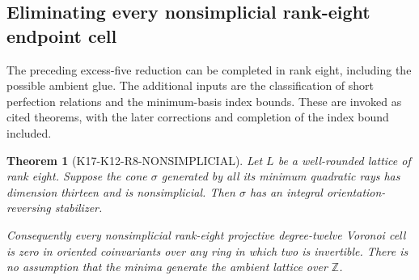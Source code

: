 \documentclass[11pt,a4paper]{article}
\newtheorem{theorem}{Theorem}[section]
\theoremstyle{definition}
\begin{document}
\subsection{Eliminating every nonsimplicial rank-eight endpoint cell}
\label{subsec:k12-r8-nonsimplicial}

The preceding excess-five reduction can be completed in rank eight,
including the possible ambient glue. The additional inputs are the
classification of short perfection relations and the minimum-basis
index bounds. These are invoked as cited theorems, with the later
corrections and completion of the index bound included.

\begin{theorem}[K17-K12-R8-NONSIMPLICIAL]
\label{thm:k12-r8-nonsimplicial}
Let $L$ be a well-rounded lattice of rank eight. Suppose the cone
$\sigma$ generated by all its minimum quadratic rays has dimension
thirteen and is nonsimplicial. Then $\sigma$ has an integral
orientation-reversing stabilizer.

Consequently every nonsimplicial rank-eight projective degree-twelve
Voronoi cell is zero in oriented coinvariants over any ring in which
two is invertible. There is no assumption that the minima generate
the ambient lattice over $\mathbb Z$.
\end{theorem}
\end{document}
